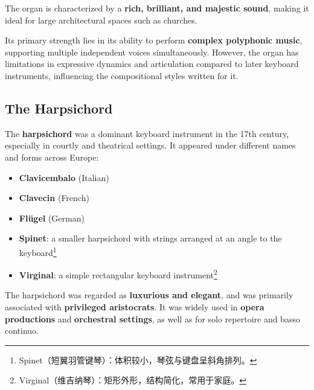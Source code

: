\documentclass[math,code]{amznotes}
\theoremstyle{remark}
\begin{document}
The organ is characterized by a \textbf{rich, brilliant, and majestic sound}, making it ideal for large architectural spaces such as churches.

Its primary strength lies in its ability to perform \textbf{complex polyphonic music}, supporting multiple independent voices simultaneously. 
However, the organ has limitations in expressive dynamics and articulation compared to later keyboard instruments, influencing the compositional styles written for it.

\subsection{The Harpsichord}

The \textbf{harpsichord} was a dominant keyboard instrument in the 17th century, especially in courtly and theatrical settings. It appeared under different names and forms across Europe:
\begin{itemize}
    \item \textbf{Clavicembalo} (Italian)
    \item \textbf{Clavecin} (French)
    \item \textbf{Fl\"ugel} (German)
    \item \textbf{Spinet}: a smaller harpsichord with strings arranged at an angle to the keyboard\footnote{Spinet（短翼羽管键琴）：体积较小，琴弦与键盘呈斜角排列。}
    \item \textbf{Virginal}: a simple rectangular keyboard instrument\footnote{Virginal（维吉纳琴）：矩形外形，结构简化，常用于家庭。}
\end{itemize}

The harpsichord was regarded as \textbf{luxurious and elegant}, and was primarily associated with \textbf{privileged aristocrats}. It was widely used in \textbf{opera productions} and \textbf{orchestral settings}, as well as for solo repertoire and basso continuo.
\end{document}
